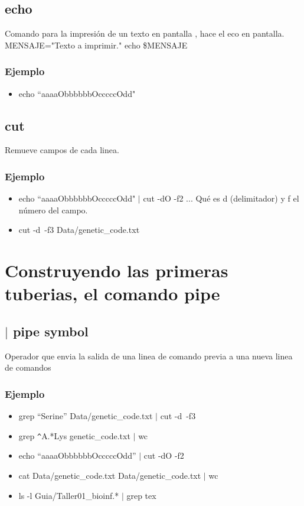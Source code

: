 \documentclass[10pt]{article}
\begin{document}
\subsection{echo}
Comando para la impresión de un texto en pantalla , hace el eco en pantalla.
MENSAJE="Texto a imprimir." echo \$MENSAJE
\subsubsection{Ejemplo}
\begin{itemize}
\item echo ``aaaaObbbbbbOcccccOdd"
\end{itemize}

\subsection{cut}
Remueve campos de cada linea.

\subsubsection{Ejemplo}
\begin{itemize}
\item echo ``aaaaObbbbbbOcccccOdd" $|$ cut -dO -f2 ... Qué es d (delimitador) y f el número del campo.
\item cut -d\, -f3 Data/genetic\_code.txt
\end{itemize}

\section{Construyendo las primeras tuberias, el comando pipe}

\subsection{$|$ pipe symbol}
Operador que envia la salida de una linea de comando previa a una nueva linea de comandos

\subsubsection{Ejemplo}
\begin{itemize}
\item grep ``Serine'' Data/genetic\_code.txt $|$ cut -d\, -f3
\item grep \verb"^"A.*Lys genetic\_code.txt $|$ wc
\item echo ``aaaaObbbbbbOcccccOdd'' $|$ cut -dO -f2
\item cat Data/genetic\_code.txt Data/genetic\_code.txt $|$ wc
\item ls -l Guia/Taller01\_bioinf.* $|$ grep tex
\end{itemize}
\end{document}
